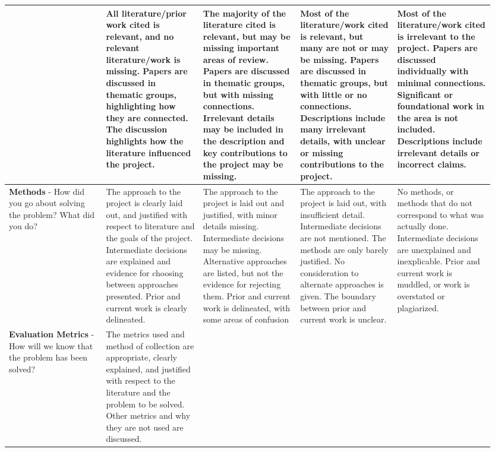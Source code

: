\documentclass[10pt,twocolumn]{article}
\begin{document}
\begin{landscape}
\begin{longtable}{p{0.19\linewidth} | p{0.19\linewidth} | p{0.19\linewidth} | p{0.19\linewidth} | p{0.19\linewidth}}
    & \cellcolor{excellent} All literature/prior work cited is relevant, and no relevant literature/work is missing. Papers are discussed in thematic groups, highlighting how they are connected. The discussion highlights how the literature influenced the project.
    & \cellcolor{good} The majority of the literature cited is relevant, but may be missing important areas of review. Papers are discussed in thematic groups, but with missing connections. Irrelevant details may be included in the description and key contributions to the project may be missing.
    & \cellcolor{marginal} Most of the literature/work cited is relevant, but many are not or may be missing. Papers are discussed in thematic groups, but with little or no connections. Descriptions include many irrelevant details, with unclear or missing contributions to the project.
    & \cellcolor{unacceptable} Most of the literature/work cited is irrelevant to the project. Papers are discussed individually with minimal connections. Significant or foundational work in the area is not included. Descriptions include irrelevant details or incorrect claims. \\
\midrule
\textbf{Methods} - How did you go about solving the problem? What did you do?
    & \cellcolor{excellent} The approach to the project is clearly laid out, and justified with respect to literature and the goals of the project. Intermediate decisions are explained and evidence for choosing between approaches presented. Prior and current work is clearly delineated.
    & \cellcolor{good} The approach to the project is laid out and justified, with minor details missing. Intermediate decisions may be missing. Alternative approaches are listed, but not the evidence for rejecting them. Prior and current work is delineated, with some areas of confusion
    & \cellcolor{marginal} The approach to the project is laid out, with insufficient detail. Intermediate decisions are not mentioned. The methods are only barely justified. No consideration to alternate approaches is given. The boundary between prior and current work is unclear.
    & \cellcolor{unacceptable} No methods, or methods that do not correspond to what was actually done. Intermediate decisions are unexplained and inexplicable. Prior and current work is muddled, or work is overstated or plagiarized. \\
\midrule
\textbf{Evaluation Metrics} - How will we know that the problem has been solved?
    & \cellcolor{excellent} The metrics used and method of collection are appropriate, clearly explained, and justified with respect to the literature and the problem to be solved. Other metrics and why they are not used are discussed.

\end{longtable}
\end{landscape}
\end{document}
